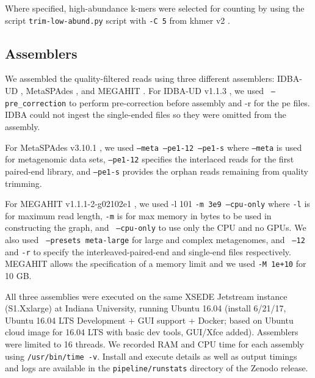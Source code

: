 \documentclass[11pt]{article}
\begin{document}

Where specified, high-abundance k-mers were selected for counting by
using the script {\tt trim-low-abund.py} script with {\tt -C 5} from
khmer v2 \cite{streaming, khmer2}.


\subsection*{Assemblers}

We assembled the quality-filtered reads using three different
assemblers: IDBA-UD \cite{idba}, MetaSPAdes \cite{metaspades}, and MEGAHIT
\cite{megahit}.  For IDBA-UD v1.1.3 \cite{idba}, we used {\tt
  {--pre\_correction}} to perform pre-correction before assembly and
-r for the pe files.  IDBA could not ingest the single-ended files so
they were omitted from the assembly.


For MetaSPAdes v3.10.1 \cite{metaspades}, we used { \tt {--meta --pe1-12
    --pe1-s}} where {\tt{--meta}} is used for
metagenomic data sets, {\tt{--pe1-12}} specifies the interlaced reads
for the first paired-end library, and {\tt{--pe1-s}} provides the
orphan reads remaining from quality trimming.


For MEGAHIT v1.1.1-2-g02102e1 \cite{megahit}, we used -l 101 {\tt{-m 3e9
    --cpu-only}} where {\tt -l} is for maximum read length, {\tt -m} is
for max memory in bytes to be used in constructing the graph, and {\tt
  {--cpu-only}} to use only the CPU and no GPUs. We also used {\tt
  {--presets meta-large}} for large and complex metagenomes, and {\tt
  {--12} } and {\tt{-r}} to specify the
interleaved-paired-end and single-end files respectively.  MEGAHIT allows
the specification of a memory limit and we used {\tt -M 1e+10} for 10 GB.


All three assemblies were executed on the same XSEDE Jetstream
instance (S1.Xxlarge) at Indiana University, running Ubuntu 16.04
(install 6/21/17, Ubuntu 16.04 LTS Development + GUI support + Docker;
based on Ubuntu cloud image for 16.04 LTS with basic dev tools,
GUI/Xfce added).  Assemblers were limited to 16 threads.  We recorded
RAM and CPU time for each assembly using {\tt /usr/bin/time -v}.
Install and execute details as well as output timings and logs are
available in the {\tt pipeline/runstats} directory of the Zenodo
release.
\end{document}
